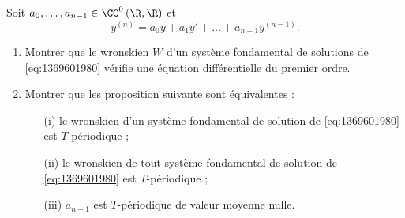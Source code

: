 \begin{enonce}
\begin{exercise}[ID={RMS123 E613, Mines PSI},subtitle={},tags={}, difficulty={0}]
Soit $a_0,\dotsc,a_{n-1}\in\CC^0\left( \R,\R \right)$ et
\begin{equation}
  \tag{E} \label{eq:1369601980}
  y^{(n)} = a_0 y + a_1 y' + \dotsc + a_{n-1} y^{(n-1)}.
\end{equation}
\begin{enumerate}
  \item Montrer que le wronskien $W$ d'un système fondamental de solutions de \eqref{eq:1369601980} vérifie une équation différentielle du premier ordre.
  \item Montrer que les proposition suivante sont équivalentes :
    \begin{enumerate}
      \item[(i) ] le wronskien d'un système fondamental de solution de \eqref{eq:1369601980} est $T$-périodique ;
      \item[(ii) ] le wronskien de tout système fondamental de solution de \eqref{eq:1369601980} est $T$-périodique ;
      \item[(iii) ] $a_{n-1}$ est $T$-périodique de valeur moyenne nulle.
    \end{enumerate}
\end{enumerate}
\end{exercise}
\begin{solution}
\end{solution}
\end{enonce}
